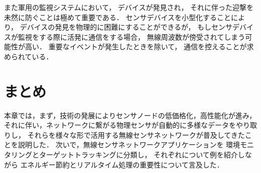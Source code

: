 また軍用の監視システムにおいて，
デバイスが発見され，
それに伴った迎撃を
未然に防ぐことは極めて重要である．
センサデバイスを小型化することにより，
デバイスの発見を物理的に困難にすることができるが，
もしセンサデバイスが監視をする際に活発に通信をする場合，
無線周波数が傍受されてしまう可能性が高い．
重要なイベントが発生したときを除いて，
通信を控えることが求められている．






\section{まとめ}
本章では，まず，技術の発展によりセンサノードの低価格化，高性能化が進み，
それに伴い，ネットワークに繋がる物理センサが自動的に多様なデータをやり取りし，
それらを様々な形で活用する無線センサネットワークが普及してきたことを説明した．
次いで，無線センサネットワークアプリケーションを
環境モニタリングとターゲットトラッキングに分類し，
それぞれについて例を紹介しながら
エネルギー節約とリアルタイム処理の重要性について言及した．

